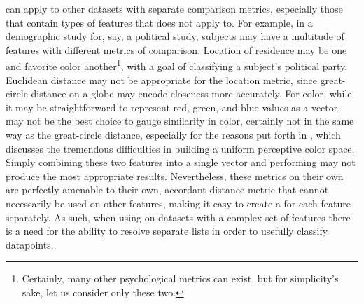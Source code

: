 \krap{} can apply to other datasets with separate comparison metrics, especially those that contain types of features that \euclid{} does not apply to.
For example, in a demographic study for, say, a political study, subjects may have a multitude of features with different metrics of comparison.
Location of residence may be one and favorite color another\footnote{Certainly, many other psychological metrics can exist, but for simplicity's sake, let us consider only these two.}, with a goal of classifying a subject's political party.
Euclidean distance may not be appropriate for the location metric, since great-circle distance on a globe may encode closeness more accurately.
For color, while it may be straightforward to represent red, green, and blue values as a vector, \euclid{} may not be the best choice to gauge similarity in color, certainly not in the same way as the great-circle distance, especially for the reasons put forth in \cite{mcleod2014proof}, which discusses the tremendous difficulties in building a uniform perceptive color space.
Simply combining these two features into a single vector and performing \euclid{} may not produce the most appropriate results.
Nevertheless, these metrics on their own are perfectly amenable to their own, accordant distance metric that cannot necessarily be used on other features, making it easy to create a \kNN{} for each feature separately.
As such, when using \kNN{} on datasets with a complex set of features there is a need for the ability to resolve separate \kNN{} lists in order to usefully classify datapoints.